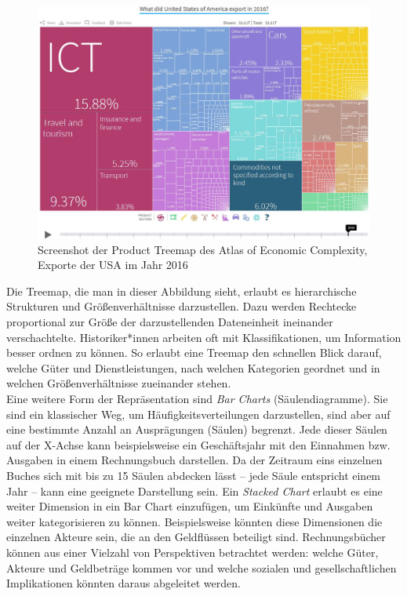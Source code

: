 \documentclass[12pt,a4paper]{article}
\begin{document}
\begin{figure}[H]
\centering
	\includegraphics[width=1\textwidth]{img/atlas.jpg}  
    \caption[Screenshot der Product Treemap des Atlas of Economic Complexity, Exporte der USA im Jahr 2016, atlas.cid.harvard.edu 09.12.2019.]{Screenshot der Product Treemap des Atlas of Economic Complexity, Exporte der USA im Jahr 2016} \label{fig:atlas}
\end{figure}
Die Treemap, die man in dieser Abbildung sieht, erlaubt es hierarchische Strukturen und Größenverhältnisse darzustellen. Dazu werden Rechtecke proportional zur Größe der darzustellenden Dateneinheit ineinander verschachtelte. Historiker*innen arbeiten oft mit Klassifikationen, um Information besser ordnen zu können. So erlaubt eine Treemap den schnellen Blick darauf, welche Güter und Dienstleistungen, nach welchen Kategorien geordnet und in welchen Größenverhältnisse zueinander stehen.
\\
Eine weitere Form der Repräsentation sind \textit{Bar Charts} (Säulendiagramme). Sie sind ein klassischer Weg, um Häufigkeitsverteilungen darzustellen, sind aber auf eine bestimmte Anzahl an Ausprägungen (Säulen) begrenzt. Jede dieser Säulen auf der X-Achse kann beispielsweise ein Geschäftsjahr mit den Einnahmen bzw. Ausgaben in einem Rechnungsbuch darstellen. Da der Zeitraum eins einzelnen Buches sich mit bis zu 15 Säulen abdecken lässt – jede Säule entspricht einem Jahr – kann eine geeignete Darstellung sein. Ein \textit{Stacked Chart} erlaubt es eine weiter Dimension in ein Bar Chart einzufügen, um Einkünfte und Ausgaben weiter kategorisieren zu können. Beispielsweise könnten diese Dimensionen die einzelnen Akteure sein, die an den Geldflüssen beteiligt sind. Rechnungsbücher können aus einer Vielzahl von Perspektiven betrachtet werden: welche Güter, Akteure und Geldbeträge kommen vor und welche sozialen und gesellschaftlichen Implikationen könnten daraus abgeleitet werden.
\end{document}
